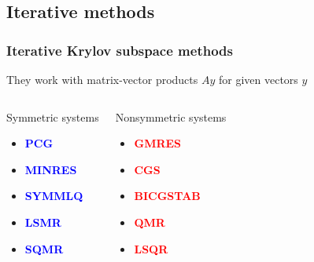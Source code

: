 \documentclass[handout]{beamer}
{
\usepackage{fullpage}
\usepackage{hyperref}
\usepackage{amssymb} 
}
\newcommand{\red}[1]{\textcolor{red}{#1}}
\newcommand{\blue}[1]{\textcolor{blue}{#1}}
\begin{document}
\subsection{Iterative methods}

\begin{frame}
\frametitle{Iterative Krylov subspace methods}

They work with matrix-vector products $Ay$ for given vectors $y$
\begin{columns}[t]
\begin{block}{Symmetric systems}
\begin{itemize}
\item \blue{\bf{PCG}}
\item \blue{\bf{MINRES}}
\item \blue{\bf{SYMMLQ}}
\item \blue{\bf{LSMR}}
\item \blue{\bf{SQMR}}
\end{itemize}
\end{block}

\begin{block}{Nonsymmetric systems}
\begin{itemize}
\item \red{\bf{GMRES}}
\item \red{\bf{CGS}}
\item \red{\bf{BICGSTAB}}
\item \red{\bf{QMR}}
\item \red{\bf{LSQR}}
\end{itemize}
\end{block}
\end{columns}

\pause


\end{frame}
\end{document}
